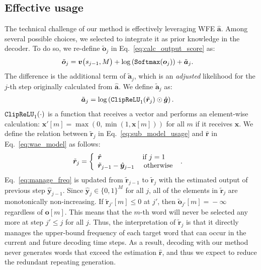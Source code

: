 \documentclass[11pt]{article}
\begin{document}
   
\subsection{Effective usage}
   The technical challenge of our method is effectively leveraging WFE $\hat{\bm a}$. 
   Among several possible choices, we selected to integrate it as prior knowledge in the decoder.
   To do so, we re-define $\tilde{\bm{o}}_j$ in Eq.~\ref{eq:calc_output_score} as:
\begin{align}
 \displaystyle
 & \displaystyle
 \tilde{\bm{o}}_j
 = \displaystyle
 \bm{v}\big(s_{j-1}, {M}\big)
 +
 \log
 \left(
 {\tt Softmax}(\bm{o}_{j})
 \right)
 + \tilde{\bm{a}}_j
\nonumber
  .
\end{align}
   The difference is the additional term of $\tilde{\bm{a}}_j$,
   which is an {\it adjusted} likelihood for the $j$-th step originally calculated from $\hat{\bm{a}}$.
   We define $\tilde{\bm{a}}_j$ as: 
\begin{align}
 &
  \tilde{\bm{a}}_j
 =
 \log
 \left(
 {\tt ClipReLU}_{1}(\tilde{\bm r}_{j})
 \odot
 \hat{\bm{g}}
 \right)
 \label{eq:sub_model_usage}
 .
\end{align}
   $ {\tt ClipReLU}_{1}(\cdot)$ is a function that receives a vector and performs an element-wise calculation:
   $\bm{x}'[m]\!=\!\max\left(0, \min(1, \bm{x}[m]) \right)$ for all $m$ if it receives $\bm{x}$.
   We define the relation between $\tilde{\bm r}_j$ in Eq.~\ref{eq:sub_model_usage} and $\hat{\bm r}$ in Eq.~\ref{eq:wae_model} as follows:
\begin{align}
 \tilde{\bm r}_j
 &=\left\{
 \begin{array}{l}
  \hat{{\bm r}} \hspace{5.5em}\mbox{ if } j=1
   \\
  \tilde{\bm r}_{j-1} - \hat{\bm{y}}_{j-1} \hspace{1em}\mbox{ otherwise } 
 \end{array}
 \right.
 .
 \label{eq:manage_freq}
\end{align}
   Eq.~\ref{eq:manage_freq} is updated from $\tilde{\bm r}_{j-1}$ to $\tilde{\bm r}_{j}$ with the estimated output of previous step $\hat{\bm{y}}_{j-1}$.
   Since $\hat{\bm{y}}_{j} \!\in\! \{0,1\}^{M}$ for all $j$,
   all of the elements in $\tilde{\bm r}_j$ are monotonically non-increasing. 
   If $\tilde{\bm{r}}_{j'}[m] \!\leq\! 0$ at $j'$, then $\tilde{\bm{o}}_{j'}[m]\!=\!-\infty$ regardless of ${\bm{o}}[m]$.
   This means that the $m$-th word will never be selected any more at step $j'\leq j$ for all $j$.
   Thus, the interpretation of $\tilde{\bm r}_j$ is that it directly manages the upper-bound frequency of each target word that can occur in the current and future decoding time steps.
   As a result, decoding with our method never generates words that exceed the estimation $\hat{\bm r}$, and thus we expect to reduce the redundant repeating generation.
\end{document}
